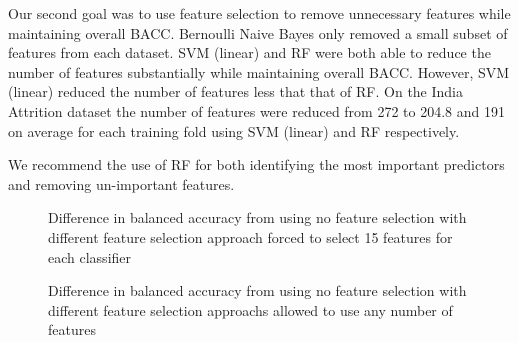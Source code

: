 \documentclass{sig-alternate-05-2015}
\begin{document}
	Our second goal was to use feature selection to remove unnecessary features while maintaining overall BACC. Bernoulli Naive Bayes only removed a small subset of features from each dataset. SVM (linear) and RF were both able to reduce the number of features substantially while maintaining overall BACC. However, SVM (linear) reduced the number of features less that that of RF. On the India Attrition dataset the number of features were reduced from 272 to 204.8 and 191 on average for each training fold using SVM (linear) and RF respectively.
	
	We recommend the use of RF for both identifying the most important predictors and removing un-important features.
	
	\begin{figure}
		\centering
		\caption{Difference in balanced accuracy from using no feature selection with different feature selection approach forced to select 15 features for each classifier}
		\label{fig:feature_selection_limit_15}
	\end{figure}
	
	\begin{figure}
		\centering
		\caption{Difference in balanced accuracy from using no feature selection with different feature selection approachs allowed to use any number of features}
		\label{fig:feature_selection_unlimited}
	\end{figure}
	
\end{document}
